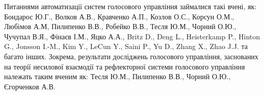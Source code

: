 %
%
%
%
%

Питаннями автоматизації систем голосового управління займалися такі вчені, як: Бондарос Ю.Г., Волков А.В., Кравченко А.П., Козлов О.С., Корсун О.М., Любімов А.М, Пилипенко В.В., Робейко В.В., Тесля Ю.М., Чорний О.Ю., Чучупал В.Я., Фінаєв І.М., Яцко А.А., Britz D., Deng L., Heisterkamp P., Hinton G., Jonsson I.-M., Kim Y., LeCun Y., Saini P., Yu D., Zhang X., Zhao J.J. та багато інших. Зокрема, результати досліджень голосового управління, заснованих на теорії несилової взаємодії та рефлекторної системи голосового управління належать таким вченим як: Тесля Ю.М., Пилипенко В.В., Чорний О.Ю., Єгорченков А.В.


